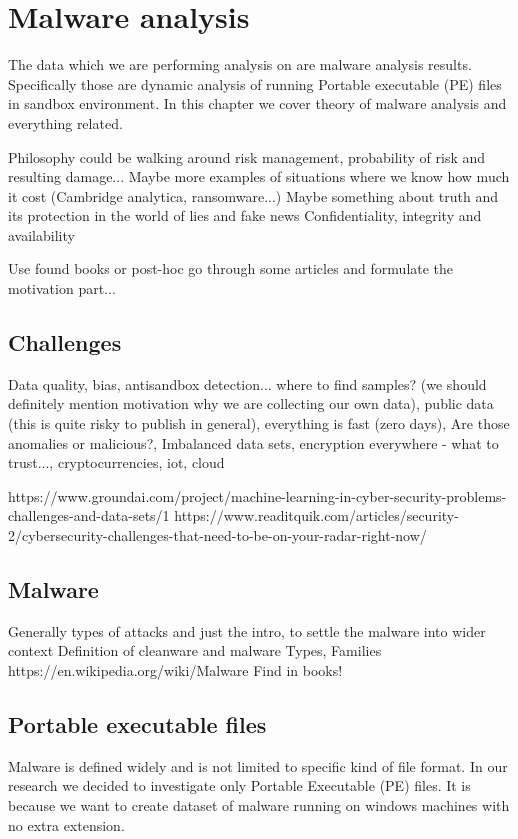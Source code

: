 \chapter{Malware analysis}
The data which we are performing analysis on are malware analysis results. Specifically those are dynamic analysis of running Portable executable (PE) files in sandbox environment. In this chapter we cover theory of malware analysis and everything related. 

Philosophy could be walking around risk management, probability of risk and resulting damage... Maybe more examples of situations where we know how much it cost (Cambridge analytica, ransomware...)
Maybe something about truth and its protection in the world of lies and fake news
Confidentiality, integrity and availability

Use found books or post-hoc go through some articles and formulate the motivation part...


\section{Challenges}
Data quality, bias, antisandbox detection... where to find samples? (we should definitely mention motivation why we are collecting our own data), public data (this is quite risky to publish in general), everything is fast (zero days), Are those anomalies or malicious?, Imbalanced data sets, encryption everywhere - what to trust..., cryptocurrencies, iot, cloud

https://www.groundai.com/project/machine-learning-in-cyber-security-problems-challenges-and-data-sets/1
https://www.readitquik.com/articles/security-2/cybersecurity-challenges-that-need-to-be-on-your-radar-right-now/


\section{Malware}
Generally types of attacks and just the intro, to settle the malware into wider context
Definition of cleanware and malware
Types, Families
https://en.wikipedia.org/wiki/Malware
Find in books!

\section{Portable executable files}
Malware is defined widely and is not limited to specific kind of file format. In our research we decided to investigate only Portable Executable (PE) files. It is because we want to create dataset of malware running on windows machines with no extra extension. 

